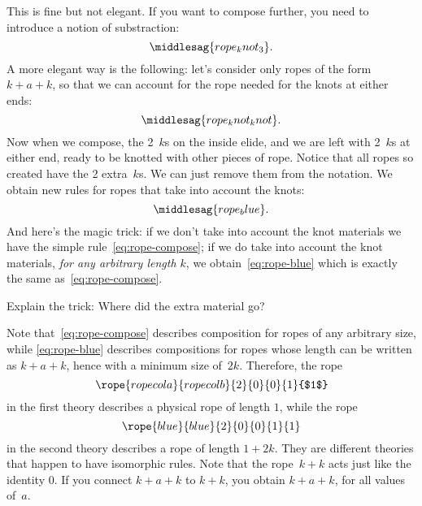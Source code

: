 %
%
This is fine but not elegant.
If you want to compose further, you need to introduce a notion of substraction:
%
\begin{equation}
	\label{eq:rope-k2}
	\middlesag{rope_knot_3}.
\end{equation}
%
A more elegant way is the following: let's consider only ropes of the form~$k + a + k$, so that we can account for the rope needed for the knots at either ends:
%
\begin{equation}
	\label{eq:rope-kk}
	\middlesag{rope_knot_knot}.
\end{equation}
%
Now when we compose, the 2~$k$s on the inside elide, and we are left with 2~$k$s at either end, ready to be knotted with other pieces of rope.
Notice that all ropes so created have the 2 extra~$k$s.
We can just remove them from the notation.
We obtain new rules for ropes that take into account the knots:
%
\begin{equation}
	\label{eq:rope-blue}
	\middlesag{rope_blue}.
\end{equation}
%
And here's the magic trick: if we don't take into account the knot materials we have the simple rule~\cref{eq:rope-compose}; if we do take into account the knot materials, \emph{for any arbitrary length $k$}, we obtain~\cref{eq:rope-blue} which is exactly the same as~\cref{eq:rope-compose}.
\begin{exercise}
	Explain the trick: Where did the extra material go?
\end{exercise}
\begin{solution}
	Note that~\cref{eq:rope-compose} describes composition for ropes of any arbitrary size, while \cref{eq:rope-blue} describes compositions for ropes whose length can be written as $k+a+k$, hence with a minimum size of~$2k$.
	Therefore, the rope
	\begin{equation}
		\rope{ropecola}{ropecolb}{2}{0}{0}{1}{$1$}
	\end{equation}
	in the first theory describes a physical rope of length $1$, while the rope
	\begin{equation}
		\rope{blue}{blue}{2}{0}{0}{1}{1}
	\end{equation}
	in the second theory describes a rope of length $1+2k$.
	They are different theories that happen to have isomorphic rules.
	Note that the rope~$k+k$ acts just like the identity 0.
	If you connect $k + a + k$ to $k+k$, you obtain $k + a + k$, for all values of~$a$.
\end{solution}
